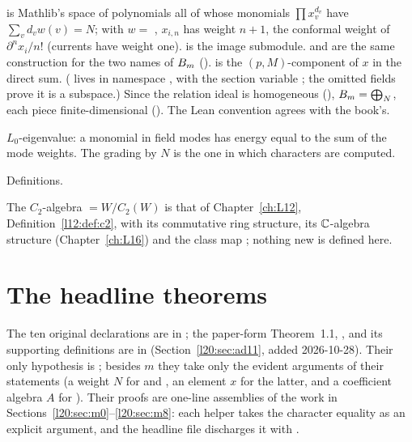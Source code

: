 \begin{dictionary}
 is Mathlib's space of polynomials all of whose monomials
$\prod x_v^{d_v}$ have $\sum_vd_vw(v)=N$; with $w=$ , $x_{i,n}$ has weight $n+1$, the
conformal weight of $\partial^nx_i/n!$ (currents have weight one).  is the image submodule.
 and  are the same construction for the two names of $B_m$
().  is the $(p,M)$-component of $x$ in the
direct sum. ( lives in namespace , with the section
variable ; the omitted fields prove it is a subspace.) Since the relation ideal is homogeneous
(), $B_m=\bigoplus_N$, each piece
finite-dimensional (). The Lean convention agrees with the book's.
\end{dictionary}

\begin{physics}
$L_0$-eigenvalue: a monomial in field modes has energy equal to the sum of the mode weights. The grading
by $N$ is the one in which characters are computed.
\end{physics}

\begin{status}
Definitions.
\end{status}

The $C_2$-algebra  $=W/C_2(W)$ is that of Chapter~\ref{ch:L12}, Definition~\ref{l12:def:c2}, with its
commutative ring structure, its ${\mathbb{C}}$-algebra structure (Chapter~\ref{ch:L16}) and the class map
; nothing new is defined here.

\section{The headline theorems}\label{l20:sec:headlines}

The ten original declarations are in ;
the paper-form Theorem~1.1, , and its supporting definitions are in
 (Section~\ref{l20:sec:ad11}, added 2026-10-28).
Their only hypothesis is ; besides $m$ they take only the evident arguments of their statements (a weight
$N$ for  and , an element $x$ for the latter, and a
coefficient algebra $A$ for ). Their proofs are
one-line assemblies of the work in Sections~\ref{l20:sec:m0}--\ref{l20:sec:m8}: each 
helper takes the character equality as an explicit argument, and the headline file discharges it with
.

